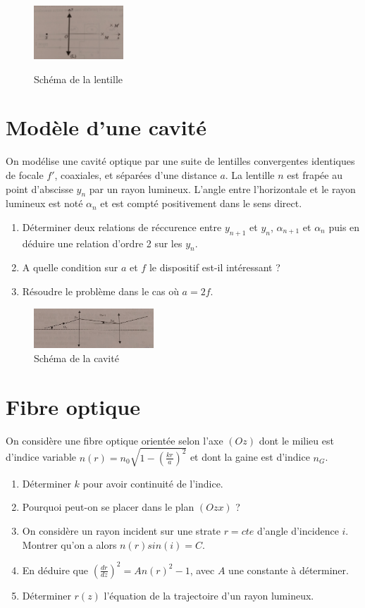 \documentclass{article}
\begin{document}
\begin{figure}[h]
  \centering
  \includegraphics[width=0.3\textwidth]{exercice 1.jpg}
  \label{fig:ex}
    \caption{Schéma de la lentille}
\end{figure}


\section{Modèle d'une cavité}

On modélise une cavité optique par une suite de lentilles convergentes identiques de focale $f'$, coaxiales, et séparées d'une distance $a$. 
La lentille $n$ est frapée au point d'abscisse $y_n$ par un rayon lumineux.
L'angle entre l'horizontale et le rayon lumineux est noté $\alpha_n$ et est compté positivement dans le sens direct. 
\begin{enumerate}
  \item Déterminer deux relations de réccurence entre $y_{n+1}$ et $y_n$, $\alpha_{n+1}$ et $\alpha_n$ puis en déduire une relation d'ordre 2 sur les $y_n$. 
  \item A quelle condition sur $a$ et $f$ le dispositif est-il intéressant ? 
  \item Résoudre le problème dans le cas où $a=2f$.
\end{enumerate}

\begin{figure}[h!]
  \centering
  \includegraphics[width=0.4\textwidth]{exercice 2.jpg}
    \caption{Schéma de la cavité}
\end{figure}
\newpage
\section{Fibre optique}

On considère une fibre optique orientée selon l'axe $(Oz)$ dont le milieu est d'indice variable $n(r)=n_0 \sqrt{1-(\frac{kr}{a})^2}$ et dont la gaine est d'indice $n_G$. 
\begin{enumerate}
  \item Déterminer $k$ pour avoir continuité de l'indice. 
  \item Pourquoi peut-on se placer dans le plan $(Ozx)$ ? 
  \item On considère un rayon incident sur une strate $r=cte$ d'angle d'incidence $i$. Montrer qu'on a alors $n(r)sin(i) = C$. 
  \item En déduire que $(\frac{dr}{dz})^2 = A n(r)^2 - 1$, avec $A$ une constante à déterminer. 
  \item Déterminer $r(z)$ l'équation de la trajectoire d'un rayon lumineux. 
\end{enumerate}
\end{document}
